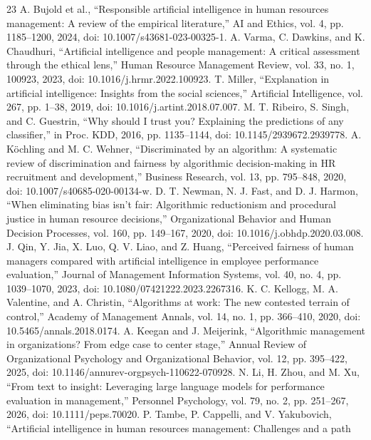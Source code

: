 \documentclass[
  10pt,
  a4paper,
  runningheads]{llncs}
\begin{document}
\begin{thebibliography}{23}
 A. Bujold et al., ``Responsible artificial intelligence in human
resources management: A review of the empirical literature,'' AI and
Ethics, vol. 4, pp. 1185--1200, 2024, doi: 10.1007/s43681-023-00325-1.
 A. Varma, C. Dawkins, and K. Chaudhuri, ``Artificial
intelligence and people management: A critical assessment through the
ethical lens,'' Human Resource Management Review, vol. 33, no. 1,
100923, 2023, doi: 10.1016/j.hrmr.2022.100923.
 T. Miller, ``Explanation in artificial intelligence: Insights
from the social sciences,'' Artificial Intelligence, vol. 267, pp.
1--38, 2019, doi: 10.1016/j.artint.2018.07.007.
 M. T. Ribeiro, S. Singh, and C. Guestrin, ``Why should I trust
you? Explaining the predictions of any classifier,'' in Proc. KDD, 2016,
pp. 1135--1144, doi: 10.1145/2939672.2939778.
 A. Köchling and M. C. Wehner, ``Discriminated by an algorithm: A
systematic review of discrimination and fairness by algorithmic
decision-making in HR recruitment and development,'' Business Research,
vol. 13, pp. 795--848, 2020, doi: 10.1007/s40685-020-00134-w.
 D. T. Newman, N. J. Fast, and D. J. Harmon, ``When eliminating
bias isn't fair: Algorithmic reductionism and procedural justice in
human resource decisions,'' Organizational Behavior and Human Decision
Processes, vol. 160, pp. 149--167, 2020, doi:
10.1016/j.obhdp.2020.03.008.
 J. Qin, Y. Jia, X. Luo, Q. V. Liao, and Z. Huang, ``Perceived
fairness of human managers compared with artificial intelligence in
employee performance evaluation,'' Journal of Management Information
Systems, vol. 40, no. 4, pp. 1039--1070, 2023, doi:
10.1080/07421222.2023.2267316.
 K. C. Kellogg, M. A. Valentine, and A. Christin, ``Algorithms at
work: The new contested terrain of control,'' Academy of Management
Annals, vol. 14, no. 1, pp. 366--410, 2020, doi:
10.5465/annals.2018.0174.
 A. Keegan and J. Meijerink, ``Algorithmic management in
organizations? From edge case to center stage,'' Annual Review of
Organizational Psychology and Organizational Behavior, vol. 12, pp.
395--422, 2025, doi: 10.1146/annurev-orgpsych-110622-070928.
 N. Li, H. Zhou, and M. Xu, ``From text to insight: Leveraging
large language models for performance evaluation in management,''
Personnel Psychology, vol. 79, no. 2, pp. 251--267, 2026, doi:
10.1111/peps.70020.
 P. Tambe, P. Cappelli, and V. Yakubovich, ``Artificial
intelligence in human resources management: Challenges and a path

\end{thebibliography}
\end{document}
